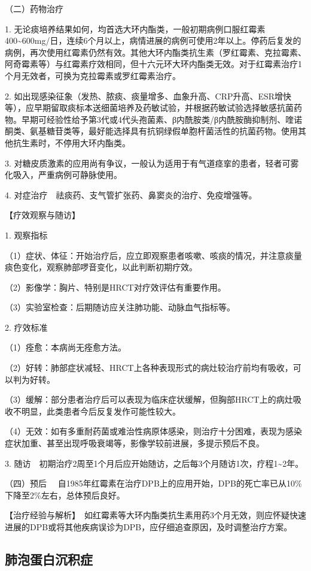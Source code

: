{（二）药物治疗}

1.
无论痰培养结果如何，均首选大环内酯类，一般初期病例口服红霉素400\textasciitilde{}600mg/日，连续6个月以上，病情进展的病例可使用2年以上。停药后复发的病例，再次使用红霉素仍然有效。其他大环内酯类抗生素（罗红霉素、克拉霉素、阿奇霉素等）与红霉素疗效相同，但十六元环大环内酯类无效。对于红霉素治疗1个月无效者，可换为克拉霉素或罗红霉素治疗。

2.
如出现感染征象（发热、脓痰、痰量增多、血象升高、CRP升高、ESR增快等），应早期留取痰标本送细菌培养及药敏试验，并根据药敏试验选择敏感抗菌药物。早期可经验性给予第3代或4代头孢菌素、β内酰胺类/β内酰胺酶抑制剂、喹诺酮类、氨基糖苷类等，最好能选择具有抗铜绿假单胞杆菌活性的抗菌药物。使用其他抗生素时，不停用大环内酯类。

3.
对糖皮质激素的应用尚有争议，一般认为适用于有气道痉挛的患者，轻者可雾化吸入，严重病例可静脉使用。

4. 对症治疗　祛痰药、支气管扩张药、鼻窦炎的治疗、免疫增强等。

【疗效观察与随访】

1. 观察指标

（1）症状、体征：开始治疗后，应立即观察患者咳嗽、咳痰的情况，并注意痰量痰色变化，观察肺部啰音变化，以此判断初期疗效。

（2）影像学：胸片、特别是HRCT对疗效评估有重要作用。

（3）实验室检查：后期随访应关注肺功能、动脉血气指标等。

2. 疗效标准

（1）痊愈：本病尚无痊愈方法。

（2）好转：肺部症状减轻、HRCT上各种表现形式的病灶较治疗前均有吸收，可以判为好转。

（3）缓解：部分患者治疗后可以表现为临床症状缓解，但胸部HRCT上的病灶吸收不明显，此类患者今后反复发作可能性较大。

（4）无效：如有多重耐药菌或难治性病原体感染，则治疗十分困难，表现为感染症状加重、甚至出现呼吸衰竭等，影像学较前进展，多提示预后不良。

3.
随访　初期治疗2周至1个月后应开始随访，之后每3个月随访1次，疗程1\textasciitilde{}2年。

{（四）预后}
　自1985年红霉素在治疗DPB上的应用开始，DPB的死亡率已从10\%下降至2\%左右，总体预后良好。

【治疗经验与解析】　如红霉素等大环内酯类抗生素用药3个月无效，则应怀疑快速进展的DPB或将其他疾病误诊为DPB，应仔细追查原因，及时调整治疗方案。

\subsection{肺泡蛋白沉积症}

